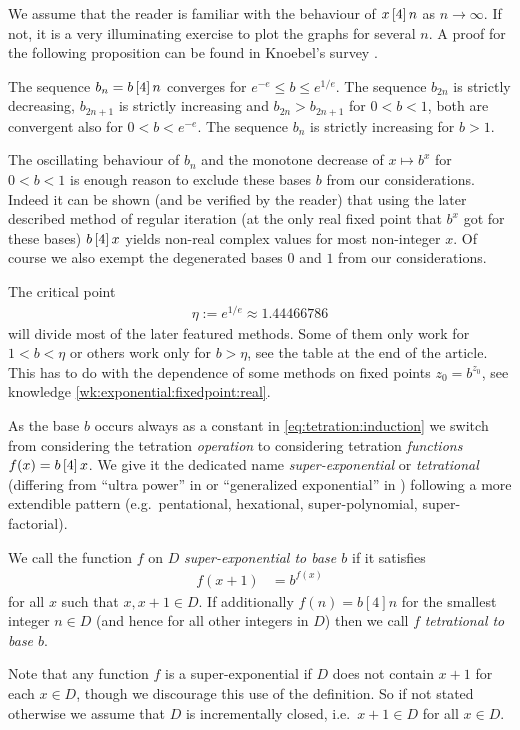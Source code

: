 \documentclass{article}
\numberwithin{equation}{section}
\begin{document}
We assume that the reader is familiar with the behaviour of $x\operatorname{[4]} n$
as $n\to\infty$. If not, it is a very illuminating exercise to plot the
graphs for several $n$. A proof for the following proposition can be
found in Knoebel's survey \cite{Knoebel:ExponentialsReiterated}.
\begin{wellknown}
  The sequence $b_n= b\operatorname{[4]} n$ converges for $e^{-e}\le b \le
  e^{1/e}$. The sequence $b_{2n}$ is strictly decreasing,
  $b_{2n+1}$ is strictly increasing and $b_{2n}>b_{2n+1}$ for $0<b<1$, both are
  convergent also for $0<b<e^{-e}$. The sequence $b_n$ is strictly
  increasing for $b>1$. 
\end{wellknown}
The oscillating  behaviour of $b_n$ and the monotone
decrease of $x\mapsto b^x$ for $0<b<1$ is enough reason to exclude these bases
$b$ from our considerations. Indeed it can be shown (and be verified
by the reader) that using the later described method of regular
iteration (at the only real fixed point that $b^x$ got for these
bases) $b \operatorname{[4]} x$ yields non-real complex values for most non-integer
$x$. Of course we also exempt the degenerated bases $0$ and $1$ from
our considerations.

The critical point 
\begin{align}
  \label{eq:eta}
  \eta:=e^{1/e}\approx 1.44466786
\end{align}
will divide most of the later featured methods. Some of them only work for $1<b<\eta$ or others work only for
$b>\eta$, see the table at the end of the article. This has to do
with the dependence of some methods on fixed points $z_0 = b^{z_0}$, see
knowledge \ref{wk:exponential:fixedpoint:real}. 

As the base $b$ occurs always as a constant in
\eqref{eq:tetration:induction} we switch from considering the
tetration {\em operation} to considering 
tetration {\em functions} $f(x)=b\operatorname{[4]} x$. We give it the dedicated
name {\em super-exponential} or {\em tetrational} (differing from
``ultra power'' in \cite{hooshmand:ultra} or ``generalized exponential'' in
\cite{Walker:infinitely}) following a more extendible pattern (e.g.\ pentational,
  hexational, super-polynomial, super-factorial).

\begin{definition}
  We call the function $f$ on $D$ {\em super-exponential to base $b$} if it
  satisfies
  \begin{align}\label{eq:tetration:maineq}
    f(x+1)&=b^{f(x)}
  \end{align}
  for all $x$ such that $x,x+1\in D$. If additionally $f(n)=b [4] n$
  for the smallest integer $n\in D$ (and hence for all other integers
  in $D$) then we call $f$ {\em tetrational to base $b$}.
\end{definition}
Note that any function $f$ is a super-exponential if $D$ does not contain
$x+1$ for each $x\in D$, though we discourage this use of the
definition. So if not stated otherwise we assume that $D$ is
incrementally closed, i.e.\ $x+1\in D$ for all $x\in D$.
\end{document}
